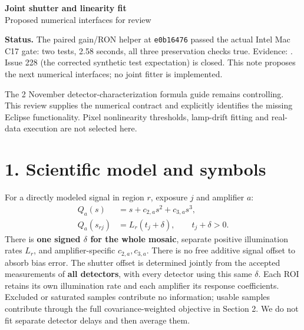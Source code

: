 \documentclass[11pt,a4paper]{article}
\begin{document}
{\LARGE\bfseries Joint shutter and linearity fit}\\[5pt]
{\large Proposed numerical interfaces for review}

\textbf{Status.} The paired gain/RON helper at
\texttt{e0b16476} passed the actual Intel Mac C17 gate: two tests, 2.58 seconds,
all three preservation checks true. Evidence:
.
Issue 228 (the corrected synthetic test expectation) is closed.
This note proposes the next numerical interfaces; no joint fitter is implemented.

The 2 November detector-characterization formula guide remains controlling.
This review supplies the numerical contract and explicitly identifies the missing
Eclipse functionality. Pixel nonlinearity thresholds, lamp-drift fitting and
real-data execution are not selected here.

\section*{1. Scientific model and symbols}
For a directly modeled signal in region $r$, exposure $j$ and amplifier $a$:
\begin{align}
Q_a(s)&=s+c_{2,a}s^2+c_{3,a}s^3,\\
Q_a(s_{rj})&=L_r(t_j+\delta),\qquad t_j+\delta>0 .
\end{align}
There is \textbf{one signed $\delta$ for the whole mosaic}, separate positive
illumination rates $L_r$, and amplifier-specific $c_{2,a},c_{3,a}$.
There is no free additive signal offset to absorb bias error.
The shutter offset is determined jointly from the accepted measurements of
\textbf{all detectors}, with every detector using this same $\delta$.
Each ROI retains its own illumination rate and each amplifier its response
coefficients. Excluded or saturated samples contribute no information; usable
samples contribute through the full covariance-weighted objective in Section 2.
We do not fit separate detector delays and then average them.
\end{document}

